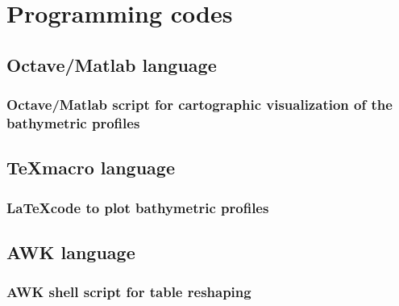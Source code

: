 \documentclass[11pt,a4paper]{report}
\begin{document}
{\pagebreak

\pagebreak
\begin{appendices}
\appendix \label{app}
\appendixpage
	
\chapter{Programming codes}\label{chp:8}

\section{Octave/Matlab language}
\subsection{Octave/Matlab script for cartographic visualization of the bathymetric profiles}\label{Oc:01}


\section{\TeX \space macro language}
\subsection{\LaTeX \space code to plot bathymetric profiles}\label{L:01}


\vspace{0.5em}

\pagebreak

\section{AWK language}
\subsection{AWK shell script for table reshaping}\label{Awk:01}

\pagebreak


\end{appendices}}
\end{document}
